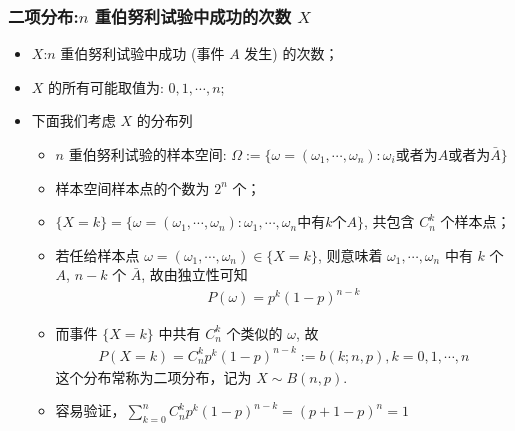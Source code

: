 \begin{frame}
	\frametitle{二项分布:$n$ 重伯努利试验中成功的次数 $X$}
	\begin{itemize}[<+-|alert@+>]
		\item $X$:$n$ 重伯努利试验中成功 (事件 $A$ 发生) 的次数；
		\item $X$ 的所有可能取值为: $0, 1, \cdots, n$;
		\item 下面我们考虑 $X$ 的分布列
		      \begin{itemize}
			      \item $n$ 重伯努利试验的样本空间: $\Omega:=\{\omega=(\omega_1,\cdots,\omega_n):\omega_i\mbox{或者为} A\mbox{或者为}\bar{A}\}$
			      \item 样本空间样本点的个数为 $2^n$ 个；
			      \item $\{X=k\}=\{\omega=(\omega_1,\cdots,\omega_n):\omega_1,\cdots,\omega_n\mbox{中有} k\mbox{个} A\}$, 共包含 $C_n^k$ 个样本点；
			      \item 若任给样本点 $\omega=(\omega_1,\cdots,\omega_n)\in \{X=k\}$, 则意味着 $\omega_1,\cdots,\omega_n$ 中有 $k$ 个 $A$, $n-k$ 个 $\bar{A}$, 故由独立性可知
			            \begin{eqnarray*}
				            P(\omega)=p^k(1-p)^{n-k}
			            \end{eqnarray*}
			      \item 而事件 $\{X=k\}$ 中共有 $C_n^k$ 个类似的 $\omega$, 故
			            \begin{eqnarray*}
				            P(X=k)=C_n^kp^k(1-p)^{n-k}:=b(k;n,p), k=0,1,\cdots, n
			            \end{eqnarray*}
			            这个分布常称为二项分布，记为 $X\sim B (n,p)$.
			      \item 容易验证，$\sum_{k=0}^nC_n^kp^k (1-p)^{n-k}=(p+1-p)^n=1$
		      \end{itemize}
	\end{itemize}

\end{frame}
